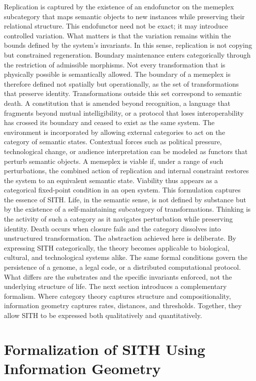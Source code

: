 \documentclass[11pt,oneside]{article}
\begin{document}
Replication is captured by the existence of an endofunctor on the memeplex subcategory that maps semantic objects to new instances while preserving their relational structure. This endofunctor need not be exact; it may introduce controlled variation. What matters is that the variation remains within the bounds defined by the system’s invariants. In this sense, replication is not copying but constrained regeneration.
Boundary maintenance enters categorically through the restriction of admissible morphisms. Not every transformation that is physically possible is semantically allowed. The boundary of a memeplex is therefore defined not spatially but operationally, as the set of transformations that preserve identity. Transformations outside this set correspond to semantic death. A constitution that is amended beyond recognition, a language that fragments beyond mutual intelligibility, or a protocol that loses interoperability has crossed its boundary and ceased to exist as the same system.
The environment is incorporated by allowing external categories to act on the category of semantic states. Contextual forces such as political pressure, technological change, or audience interpretation can be modeled as functors that perturb semantic objects. A memeplex is viable if, under a range of such perturbations, the combined action of replication and internal constraint restores the system to an equivalent semantic state. Viability thus appears as a categorical fixed-point condition in an open system.
This formulation captures the essence of SITH. Life, in the semantic sense, is not defined by substance but by the existence of a self-maintaining subcategory of transformations. Thinking is the activity of such a category as it navigates perturbation while preserving identity. Death occurs when closure fails and the category dissolves into unstructured transformation.
The abstraction achieved here is deliberate. By expressing SITH categorically, the theory becomes applicable to biological, cultural, and technological systems alike. The same formal conditions govern the persistence of a genome, a legal code, or a distributed computational protocol. What differs are the substrates and the specific invariants enforced, not the underlying structure of life.
The next section introduces a complementary formalism. Where category theory captures structure and compositionality, information geometry captures rates, distances, and thresholds. Together, they allow SITH to be expressed both qualitatively and quantitatively.

\section{Formalization of SITH Using Information Geometry}
\end{document}

